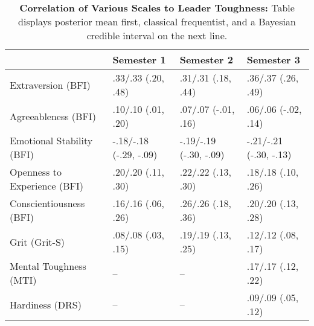 \begin{table}[ht]
\centering
\begin{tabular}{llll}
  \hline
 & Semester 1 & Semester 2 & Semester 3 \\ 
  \hline
Extraversion (BFI) & .33/.33 (.20, .48) & .31/.31 (.18, .44) & .36/.37 (.26, .49) \\ 
  Agreeableness (BFI) & .10/.10 (.01, .20) & .07/.07 (-.01, .16) & .06/.06 (-.02, .14) \\ 
  Emotional Stability (BFI) & -.18/-.18 (-.29, -.09) & -.19/-.19 (-.30, -.09) & -.21/-.21 (-.30, -.13) \\ 
  Openness to Experience (BFI) & .20/.20 (.11, .30) & .22/.22 (.13, .30) & .18/.18 (.10, .26) \\ 
  Conscientiousness (BFI) & .16/.16 (.06, .26) & .26/.26 (.18, .36) & .20/.20 (.13, .28) \\ 
  Grit (Grit-S) & .08/.08 (.03, .15) & .19/.19 (.13, .25) & .12/.12 (.08, .17) \\ 
  Mental Toughness (MTI) & -- & -- & .17/.17 (.12, .22) \\ 
  Hardiness (DRS) & -- & -- & .09/.09 (.05, .12) \\ 
   \hline
\end{tabular}
\caption{\textbf{Correlation of Various Scales to Leader Toughness:} Table displays posterior mean first, classical frequentist, and a Bayesian credible interval on the next line.} 
\label{tab:pers_corr}
\end{table}
